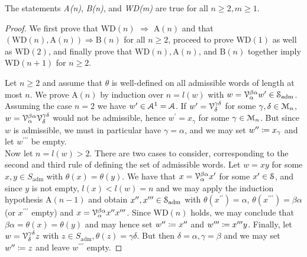 \begin{lem}\label{lem_theta_well_defined}
The statements \emph{A(n)}, \emph{B(n)}, and \emph{WD(m)} are true for all $n \geq 2, m \geq 1$.
\begin{proof}
We first prove that $\mathrm{WD}(n)$ $\Rightarrow$ $\mathrm{A}(n)$ and that $(\mathrm{WD}(n), \mathrm{A}(n)) \Rightarrow \mathrm{B}(n)$ for all $n \geq 2$, proceed to prove $\mathrm{WD}(1)$ as well as $\mathrm{WD}(2)$, and finally prove that $\mathrm{WD}(n), \mathrm{A}(n)$, and $\mathrm{B}(n)$ together imply $\mathrm{WD}(n+1)$ for $n \geq 2$.

Let $n \geq 2$ and assume that $\theta$ is well-defined on all admissible words of length at most $n$. We prove $\mathrm{A}(n)$ by induction over $n = l(w)$ with $w = \mathcal{V}^{\beta\alpha}_\alpha w^\prime \in \mathcal{S}_{\mathrm{adm}}$.\\
Assuming the case $n = 2$ we have $w^\prime \in \mathcal{A}^1 = \mathcal{A}$. If $w^\prime = \mathcal{V}^{\gamma\delta}_\delta$ for some $\gamma,\delta \in \mathcal{M}_n$, $w = \mathcal{V}^{\beta\alpha}_\alpha \mathcal{V}^{\gamma\delta}_\delta$ would not be admissible, hence $w^\prime = x_\gamma$ for some $\gamma \in \mathcal{M}_n$. But since $w$ is admissible, we must in particular have $\gamma = \alpha$, and we may set $w^{\prime\prime} \coloneqq x_\gamma$ and let $w^{\prime\prime\prime}$ be empty.\\
Now let $n = l(w) > 2$. There are two cases to consider, corresponding to the second and third rule of defining the set of admissible words. Let $w = xy$ for some $x,y \in S_{\mathrm{adm}}$ with $\theta(x) = \theta(y)$. We have that $x = \mathcal{V}^{\beta\alpha}_\alpha x^\prime$ for some $x^\prime \in \mathcal{S}$, and since $y$ is not empty, $l(x) < l(w) = n$ and we may apply the induction hypothesis $\mathrm{A}(n-1)$ and obtain $x^{\prime\prime},x^{\prime\prime\prime} \in \mathcal{S}_{\mathrm{adm}}$ with $\theta(x^{\prime\prime}) = \alpha$, $\theta(x^{\prime\prime\prime}) = \beta\alpha$ (or $x^{\prime\prime\prime}$ empty) and $x = \mathcal{V}^{\beta\alpha}_\alpha x^{\prime\prime}x^{\prime\prime\prime}$. Since $\mathrm{WD}(n)$ holds, we may conclude that $\beta\alpha = \theta(x) = \theta(y)$ and may hence set $w^{\prime\prime} \coloneqq x^{\prime\prime}$ and $w^{\prime\prime\prime} \coloneqq x^{\prime\prime\prime} y$. Finally, let $w = \mathcal{V}^{\gamma\delta}_\delta z$ with $z \in S_{\mathrm{adm}}, \theta(z) = \gamma\delta$. But then $\delta = \alpha, \gamma = \beta$ and we may set $w^{\prime\prime} \coloneqq z$ and leave $w^{\prime\prime\prime}$ empty.


\end{proof}
\end{lem}
